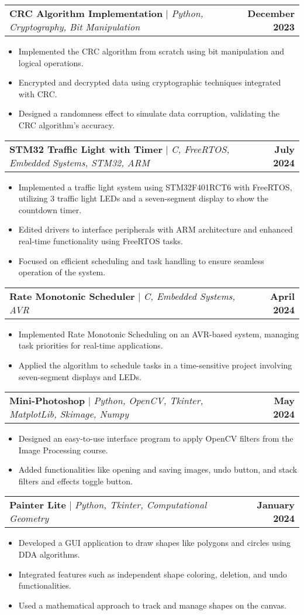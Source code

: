 \documentclass[letterpaper,11pt]{article}
\makeatletter
\newcommand{\resumeItem}[1]{
  \item\small{
    {#1 \vspace{-2pt}}
  }
}
\newcommand{\resumeProjectHeading}[2]{
    \item
    \begin{tabular*}{1.001\textwidth}{l@{\extracolsep{\fill}}r}
      \small#1 & \textbf{\small #2}\\
    \end{tabular*}\vspace{-7pt}
}
\newcommand{\resumeItemListStart}{\begin{itemize}}
\newcommand{\resumeItemListEnd}{\end{itemize}\vspace{-5pt}}
\makeatother
\begin{document}
    \resumeProjectHeading
    {\textbf{CRC Algorithm Implementation} $|$ \emph{Python, Cryptography, Bit Manipulation}}{December 2023}
    \resumeItemListStart
        \resumeItem{Implemented the CRC algorithm from scratch using bit manipulation and logical operations.}
        \resumeItem{Encrypted and decrypted data using cryptographic techniques integrated with CRC.}
        \resumeItem{Designed a randomness effect to simulate data corruption, validating the CRC algorithm's accuracy.}
    \resumeItemListEnd
    \vspace{-13pt}

    \resumeProjectHeading
    {\textbf{STM32 Traffic Light with Timer} $|$ \emph{C, FreeRTOS, Embedded Systems, STM32, ARM}}{July 2024}
    \resumeItemListStart
        \resumeItem{Implemented a traffic light system using STM32F401RCT6 with FreeRTOS, utilizing 3 traffic light LEDs and a seven-segment display to show the countdown timer.}
        \resumeItem{Edited drivers to interface peripherals with ARM architecture and enhanced real-time functionality using FreeRTOS tasks.}
        \resumeItem{Focused on efficient scheduling and task handling to ensure seamless operation of the system.}
    \resumeItemListEnd
    \vspace{-13pt}

    \resumeProjectHeading
    {\textbf{Rate Monotonic Scheduler} $|$ \emph{C, Embedded Systems, AVR}}{April 2024}
    \resumeItemListStart
        \resumeItem{Implemented Rate Monotonic Scheduling on an AVR-based system, managing task priorities for real-time applications.}
        \resumeItem{Applied the algorithm to schedule tasks in a time-sensitive project involving seven-segment displays and LEDs.}
    \resumeItemListEnd
    \vspace{-13pt}

    \resumeProjectHeading
    {\textbf{Mini-Photoshop} $|$ \emph{Python, OpenCV, Tkinter, MatplotLib, Skimage, Numpy}}{May 2024}
    \resumeItemListStart
        \resumeItem{Designed an easy-to-use interface program to apply OpenCV filters from the Image Processing course.}
        \resumeItem{Added functionalities like opening and saving images, undo button, and stack filters and effects toggle button.}
    \resumeItemListEnd 
    \vspace{-13pt}

    \resumeProjectHeading
    {\textbf{Painter Lite} $|$ \emph{Python, Tkinter, Computational Geometry}}{January 2024}
    \resumeItemListStart
        \resumeItem{Developed a GUI application to draw shapes like polygons and circles using DDA algorithms.}
        \resumeItem{Integrated features such as independent shape coloring, deletion, and undo functionalities.}
        \resumeItem{Used a mathematical approach to track and manage shapes on the canvas.}
    \resumeItemListEnd
    \vspace{-13pt}
\end{document}
